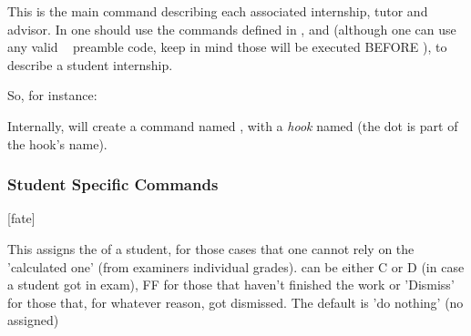 \documentclass[article,nogeometry,english,tocdepth=3,secdepth=3]{ufrgscca} %
\begin{document}
\begin{codedescribe}{\NewInternshipStudent}
    \begin{codesyntax}%
    \end{codesyntax}
    This is the main command describing each  associated internship, tutor and advisor. In  one should use the commands defined in , and  (although one can use  any valid \LaTeXe~ preamble code, keep in mind those will be executed BEFORE \tsmacro{\begin{document}}{}), to describe a student internship.
    \end{codedescribe}
        So, for instance:
        \begin{codestore}[st=d.newstudentB]
\end{codestore}

\begin{tsremark}[N.B.:]
         Internally, \tsmacro{\NewInternshipStudent}{} will create a command named \tsmacro{\studentname}{}, with a \emph{hook} named  (the dot is part of the hook's name).
\end{tsremark}         


\subsubsection{Student Specific Commands}\label{student-specific-commands}
\begin{codedescribe}{\studentFate}
	\begin{codesyntax}%
		\tsmacro{\studentFate}[fate]{}
	\end{codesyntax}
This assigns the  of a student, for those cases that one cannot rely on the 'calculated one' (from examiners individual grades).  can be either C or D (in case a student got in exam), FF for those that haven't finished the work or 'Dismiss' for those that, for whatever reason, got dismissed. The default is 'do nothing' (no  assigned)
\end{codedescribe}
\end{document}
